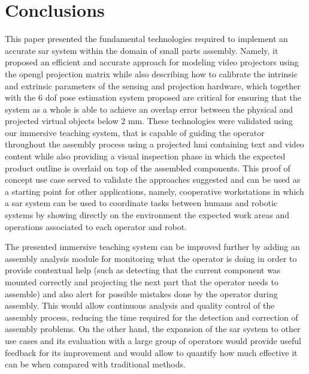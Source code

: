 \section{Conclusions}\label{sec:conclusions}

This paper presented the fundamental technologies required to implement an accurate \gls{sar} system within the domain of small parts assembly. Namely, it proposed an efficient and accurate approach for modeling video projectors using the \gls{opengl} projection matrix while also describing how to calibrate the intrinsic and extrinsic parameters of the sensing and projection hardware, which together with the 6 \gls{dof} pose estimation system proposed are critical for ensuring that the system as a whole is able to achieve an overlap error between the physical and projected virtual objects below 2 mm. These technologies were validated using our immersive teaching system, that is capable of guiding the operator throughout the assembly process using a projected \gls{hmi} containing text and video content while also providing a visual inspection phase in which the expected product outline is overlaid on top of the assembled components. This proof of concept use case served to validate the approaches suggested and can be used as a starting point for other applications, namely, cooperative workstations in which a \gls{sar} system can be used to coordinate tasks between humans and robotic systems by showing directly on the environment the expected work areas and operations associated to each operator and robot.

The presented immersive teaching system can be improved further by adding an assembly analysis module for monitoring what the operator is doing in order to provide contextual help (such as detecting that the current component was mounted correctly and projecting the next part that the operator needs to assemble) and also alert for possible mistakes done by the operator during assembly. This would allow continuous analysis and quality control of the assembly process, reducing the time required for the detection and correction of assembly problems. On the other hand, the expansion of the \gls{sar} system to other use cases and its evaluation with a large group of operators would provide useful feedback for its improvement and would allow to quantify how much effective it can be when compared with traditional methods.
